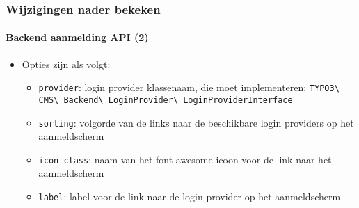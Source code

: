 \begin{frame}[fragile]
	\frametitle{Wijzigingen nader bekeken}
	\framesubtitle{Backend aanmelding API (2)}

	\begin{itemize}

		\item Opties zijn als volgt:

			\begin{itemize}

				\item \texttt{provider}:\newline
					login provider klassenaam, die moet implementeren:
						\texttt{TYPO3\textbackslash
							CMS\textbackslash
							Backend\textbackslash
							LoginProvider\textbackslash
							LoginProviderInterface}

				\item \texttt{sorting}:\newline
					volgorde van de links naar de beschikbare login providers op het aanmeldscherm

				\item \texttt{icon-class}:\newline
					naam van het font-awesome icoon voor de link naar het aanmeldscherm

				\item \texttt{label}:\newline
					label voor de link naar de login provider op het aanmeldscherm
			\end{itemize}

	\end{itemize}

\end{frame}


